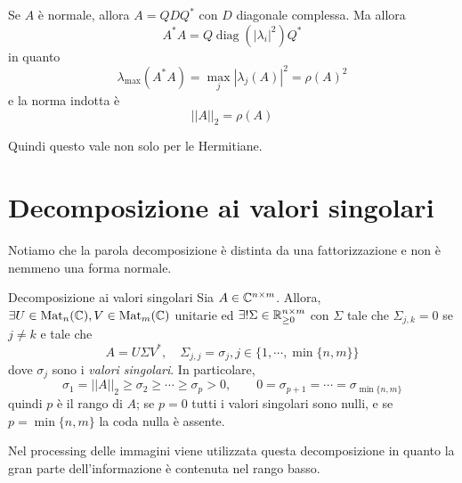 \documentclass[a4paper]{article}
\begin{document}
\begin{snippetproposition}{}
    Se \(A\) è normale,
    allora \(A = QDQ^*\) con \(D\) diagonale complessa.
    Ma allora
    \[
        A^* A = Q \operatorname{diag}(|\lambda_i|^2)Q^*
    \]
    in quanto
    \[
        \lambda_{\text{max}}(A^*A) = \max_j |\lambda_j(A)|^2 = \rho(A)^2
    \]
    e la norma indotta è
    \[
        ||A||_2 = \rho(A)
    \]
\end{snippetproposition}

Quindi questo vale non solo per le Hermitiane.

\pagebreak

\section{Decomposizione ai valori singolari}

Notiamo che la parola decomposizione è distinta da una fattorizzazione
e non è nemmeno una forma normale.

\begin{snippettheorem}{Decomposizione ai valori singolari}
    Sia \(A \in \mathbb{C}^{n \times m}\).
    Allora, \(\exists U \in \operatorname{Mat}_n(\mathbb{C}), V \in \operatorname{Mat}_m(\mathbb{C})\)
    unitarie ed \(\exists ! \Sigma \in \mathbb{R}_{\geq 0}^{n \times m}\)
    con \(\Sigma\) tale che \(\Sigma_{j,k} = 0\) se \(j \neq k\)
    e tale che \[
        A = U \Sigma V^*, \quad
        \Sigma_{j,j} = \sigma_j, j \in \{1, \cdots, \min\{n,m\}\}
    \]
    dove \(\sigma_j\) sono i \emph{valori singolari}. In particolare,
    \[
        \sigma_1 = ||A||_2
        \geq \sigma_2 \geq \cdots \geq \sigma_p > 0,\qquad 0
        = \sigma_{p+1} = \cdots = \sigma_{\min\{n,m\}}
    \]
    quindi \(p\) è il rango di \(A\); se \(p=0\) tutti i valori singolari sono nulli, e se \(p=\min\{n,m\}\) la coda nulla è assente.
\end{snippettheorem}

Nel processing delle immagini viene utilizzata questa decomposizione in quanto
la gran parte dell'informazione
è contenuta nel rango basso.
\end{document}

